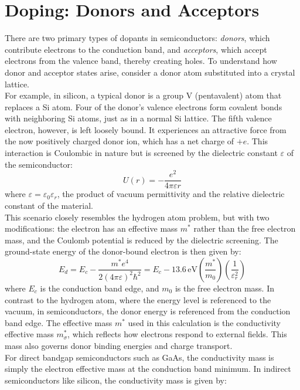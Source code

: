 \section{Doping: Donors and Acceptors}
There are two primary types of dopants in semiconductors: \textit{donors}, which contribute electrons to the conduction band, and \textit{acceptors}, which accept electrons from the valence band, thereby creating holes. To understand how donor and acceptor states arise, consider a donor atom substituted into a crystal lattice.\\
For example, in silicon, a typical donor is a group V (pentavalent) atom that replaces a Si atom. Four of the donor's valence electrons form covalent bonds with neighboring Si atoms, just as in a normal Si lattice. The fifth valence electron, however, is left loosely bound. It experiences an attractive force from the now positively charged donor ion, which has a net charge of \( +e \). This interaction is Coulombic in nature but is screened by the dielectric constant \( \varepsilon \) of the semiconductor:
\begin{equation}
	U(r) = -\frac{e^2}{4\pi \varepsilon r}
\end{equation}
\noindent
where \( \varepsilon = \varepsilon_0 \varepsilon_r \), the product of vacuum permittivity and the relative dielectric constant of the material.\\
This scenario closely resembles the hydrogen atom problem, but with two modifications: the electron has an effective mass \( m^* \) rather than the free electron mass, and the Coulomb potential is reduced by the dielectric screening. The ground-state energy of the donor-bound electron is then given by:
\begin{equation}
	E_d = E_c - \frac{m^* e^4}{2(4\pi \varepsilon)^2 \hbar^2}
	= E_c - 13.6\,\text{eV} \left( \frac{m^*}{m_0} \right) \left( \frac{1}{\varepsilon_r^2} \right)
\end{equation}
\noindent
where \( E_c \) is the conduction band edge, and \( m_0 \) is the free electron mass.
In contrast to the hydrogen atom, where the energy level is referenced to the vacuum, in semiconductors, the donor energy is referenced from the conduction band edge. The effective mass \( m^* \) used in this calculation is the conductivity effective mass \( m^*_\sigma \), which reflects how electrons respond to external fields. This mass also governs donor binding energies and charge transport.\\
For direct bandgap semiconductors such as GaAs, the conductivity mass is simply the electron effective mass at the conduction band minimum. In indirect semiconductors like silicon, the conductivity mass is given by:
